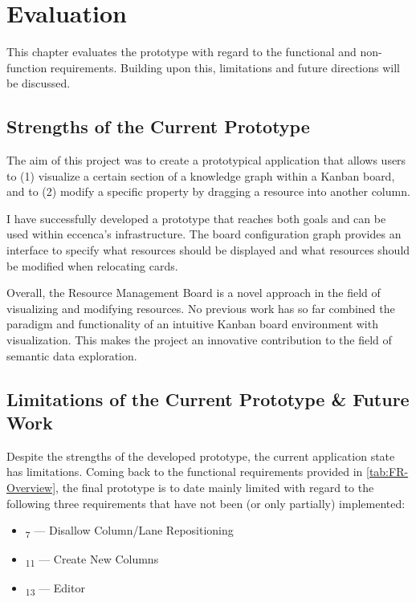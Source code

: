 \chapter{Evaluation}
\label{ch:Discussion}

This chapter evaluates the prototype with regard to the functional and non-function requirements. Building upon this, limitations and future directions will be discussed.


\section{Strengths of the Current Prototype}

The aim of this project was to create a prototypical application that allows users to (1) visualize a certain section of a knowledge graph within a Kanban board, and to (2) modify a specific property by dragging a resource into another column.

I have successfully developed a prototype that reaches both goals and can be used within eccenca’s infrastructure. The board configuration graph provides an interface to specify what resources should be displayed and what resources should be modified when relocating cards.

Overall, the Resource Management Board is a novel approach in the field of visualizing and modifying  resources. No previous work has so far combined the paradigm and functionality of an intuitive Kanban board environment with  visualization. This makes the project an innovative contribution to the field of semantic data exploration.  




\section{Limitations of the Current Prototype \& Future Work}\label{sec:Evaluation and Limitations}

Despite the strengths of the developed prototype, the current application state has limitations. Coming back to the functional requirements provided in \autoref{tab:FR-Overview}, the final prototype is to date mainly limited with regard to the following three requirements that have not been (or only partially) implemented: 

\begin{itemize}
\setlength\itemsep{-0.5em}
    \item {}\textsubscript{7}\hspace*{3pt} — Disallow Column/Lane Repositioning
    \item {}\textsubscript{11} — Create New Columns
    \item {}\textsubscript{13} —  Editor
\end{itemize}

